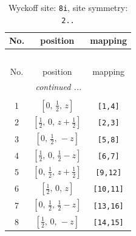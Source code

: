 \documentclass[fleqn,8pt]{jsarticle}
\begin{document}
\renewcommand{\arraystretch}{1.2}
\begin{longtable}{ccc}
\caption{Wyckoff site: {\tt 8i}, site symmetry: {\tt 2..}}
 \\
 \hline \hline
No. & position & mapping \\ \hline \endfirsthead

\multicolumn{2}{l}{\tablename\ \thetable{}} \\
 \hline \hline
No. & position & mapping \\ \hline \endhead

 \hline \hline
\multicolumn{2}{r}{\footnotesize\it continued ...} \\ \endfoot

 \hline \hline
\multicolumn{2}{r}{} \\ \endlastfoot

1 & $\left[ 0,\, \frac{1}{2},\, z \right]$ & {\tt [1,4]} \\ \hline
2 & $\left[ \frac{1}{2},\, 0,\, z + \frac{1}{2} \right]$ & {\tt [2,3]} \\ \hline
3 & $\left[ 0,\, \frac{1}{2},\, - z \right]$ & {\tt [5,8]} \\ \hline
4 & $\left[ \frac{1}{2},\, 0,\, \frac{1}{2} - z \right]$ & {\tt [6,7]} \\ \hline
5 & $\left[ 0,\, \frac{1}{2},\, z + \frac{1}{2} \right]$ & {\tt [9,12]} \\ \hline
6 & $\left[ \frac{1}{2},\, 0,\, z \right]$ & {\tt [10,11]} \\ \hline
7 & $\left[ 0,\, \frac{1}{2},\, \frac{1}{2} - z \right]$ & {\tt [13,16]} \\ \hline
8 & $\left[ \frac{1}{2},\, 0,\, - z \right]$ & {\tt [14,15]} \\
\end{longtable}
\renewcommand{\arraystretch}{1.2}
\end{document}
